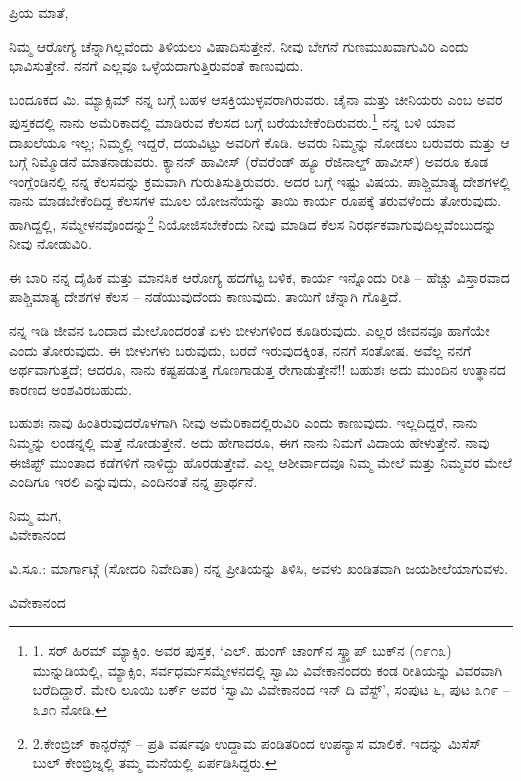 ಪ್ರಿಯ ಮಾತೆ,

ನಿಮ್ಮ ಆರೋಗ್ಯ ಚೆನ್ನಾಗಿಲ್ಲವೆಂದು ತಿಳಿಯಲು ವಿಷಾದಿಸುತ್ತೇನೆ. ನೀವು ಬೇಗನೆ ಗುಣಮುಖವಾಗುವಿರಿ ಎಂದು ಭಾವಿಸುತ್ತೇನೆ. ನನಗೆ ಎಲ್ಲವೂ ಒಳ್ಳೆಯದಾಗುತ್ತಿರುವಂತೆ ಕಾಣುವುದು.

ಬಂದೂಕದ ಮಿ. ಮ್ಯಾಕ್ಸಿಮ್​ ನನ್ನ ಬಗ್ಗೆ ಬಹಳ ಆಸಕ್ತಿಯುಳ್ಳವರಾಗಿರುವರು. ಚೈನಾ ಮತ್ತು ಚೀನಿಯರು ಎಂಬ ಅವರ ಪುಸ್ತಕದಲ್ಲಿ ನಾನು ಅಮೆರಿಕಾದಲ್ಲಿ ಮಾಡಿರುವ ಕೆಲಸದ ಬಗ್ಗೆ ಬರೆಯಬೇಕೆಂದಿರುವರು.\footnote{1. ಸರ್ ಹಿರಮ್​ ಮ್ಯಾಕ್ಸಿಂ. ಅವರ ಪುಸ್ತಕ, ‘ಎಲ್. ಹುಂಗ್ ಚಾಂಗ್​ನ ಸ್ಕ್ರ್ಯಾಪ್ ಬುಕ್​ನ (೧೯೧೩) ಮುನ್ನುಡಿಯಲ್ಲಿ, ಮ್ಯಾಕ್ಸಿಂ, ಸರ್ವಧರ್ಮಸಮ್ಮೇಳನದಲ್ಲಿ ಸ್ವಾಮಿ ವಿವೇಕಾನಂದರು ಕಂಡ ರೀತಿಯನ್ನು ವಿವರವಾಗಿ ಬರೆದಿದ್ದಾರೆ. ಮೇರಿ ಲೂಯಿ ಬರ್ಕ್ ಅವರ ‘ಸ್ವಾಮಿ ವಿವೇಕಾನಂದ ಇನ್ ದಿ ವೆಸ್ಟ್’, ಸಂಪುಟ ೬, ಪುಟ ೩೧೯ – ೩೨೧ ನೋಡಿ.} ನನ್ನ ಬಳಿ ಯಾವ ದಾಖಲೆಯೂ ಇಲ್ಲ; ನಿಮ್ಮಲ್ಲಿ ಇದ್ದರೆ, ದಯವಿಟ್ಟು ಅವರಿಗೆ ಕೊಡಿ. ಅವರು ನಿಮ್ಮನ್ನು ನೋಡಲು ಬರುವರು ಮತ್ತು ಆ ಬಗ್ಗೆ ನಿಮ್ಮೊಡನೆ ಮಾತನಾಡುವರು. ಕ್ಯಾನನ್ ಹಾವೀಸ್ (ರೆವರೆಂಡ್ ಹ್ಯೂ ರೆಜಿನಾಲ್ಡ್ ಹಾವೀಸ್) ಅವರೂ ಕೂಡ ಇಂಗ್ಲೆಂಡಿನಲ್ಲಿ ನನ್ನ ಕೆಲಸವನ್ನು ಕ್ರಮವಾಗಿ ಗುರುತಿಸುತ್ತಿರುವರು. ಅದರ ಬಗ್ಗೆ ಇಷ್ಟು ವಿಷಯ. ಪಾಶ್ಚಿಮಾತ್ಯ ದೇಶಗಳಲ್ಲಿ ನಾನು ಮಾಡಬೇಕೆಂದಿದ್ದ ಕೆಲಸಗಳ ಮೂಲ ಯೋಜನೆಯನ್ನು ತಾಯಿ ಕಾರ್ಯ ರೂಪಕ್ಕೆ ತರುವಳೆಂದು ತೋರುವುದು. ಹಾಗಿದ್ದಲ್ಲಿ, ಸಮ್ಮೇಳನವೊಂದನ್ನು\footnote{2.ಕೇಂಬ್ರಿಜ್ ಕಾನ್ಫರೆನ್ಸ್ – ಪ್ರತಿ ವರ್ಷವೂ ಉದ್ದಾಮ ಪಂಡಿತರಿಂದ ಉಪನ್ಯಾಸ ಮಾಲಿಕೆ. ಇದನ್ನು ಮಿಸೆಸ್ ಬುಲ್ ಕೇಂಬ್ರಿಜ್ನಲ್ಲಿ ತಮ್ಮ ಮನೆಯಲ್ಲಿ ಏರ್ಪಡಿಸಿದ್ದರು.} ನಿಯೋಜಿಸಬೇಕೆಂದು ನೀವು ಮಾಡಿದ ಕೆಲಸ ನಿರರ್ಥಕವಾಗುವುದಿಲ್ಲವೆಂಬುದನ್ನು ನೀವು ನೋಡುವಿರಿ.

ಈ ಬಾರಿ ನನ್ನ ದೈಹಿಕ ಮತ್ತು ಮಾನಸಿಕ ಆರೋಗ್ಯ ಹದಗೆಟ್ಟ ಬಳಿಕ, ಕಾರ್ಯ ಇನ್ನೊಂದು ರೀತಿ – ಹೆಚ್ಚು ವಿಸ್ತಾರವಾದ ಪಾಶ್ಚಿಮಾತ್ಯ ದೇಶಗಳ ಕೆಲಸ – ನಡೆಯುವುದೆಂದು ಕಾಣುವುದು. ತಾಯಿಗೆ ಚೆನ್ನಾಗಿ ಗೊತ್ತಿದೆ.

ನನ್ನ ಇಡಿ ಜೀವನ ಒಂದಾದ ಮೇಲೊಂದರಂತೆ ಏಳು ಬೀಳುಗಳಿಂದ ಕೂಡಿರುವುದು. ಎಲ್ಲರ ಜೀವನವೂ ಹಾಗೆಯೇ ಎಂದು ತೋರುವುದು. ಈ ಬೀಳುಗಳು ಬರುವುದು, ಬರದೆ ಇರುವುದಕ್ಕಿಂತ, ನನಗೆ ಸಂತೋಷ. ಅವೆಲ್ಲ ನನಗೆ ಅರ್ಥವಾಗುತ್ತದೆ; ಆದರೂ, ನಾನು ಕಷ್ಟಪಡುತ್ತ ಗೊಣಗಾಡುತ್ತ ರೇಗಾಡುತ್ತೇನೆ!! ಬಹುಶಃ ಅದು ಮುಂದಿನ ಉತ್ಥಾನದ ಕಾರಣದ ಅಂಶವಿರಬಹುದು.

ಬಹುಶಃ ನಾವು ಹಿಂತಿರುವುದರೊಳಗಾಗಿ ನೀವು ಅಮೆರಿಕಾದಲ್ಲಿರುವಿರಿ ಎಂದು ಕಾಣುವುದು. ಇಲ್ಲದಿದ್ದರೆ, ನಾನು ನಿಮ್ಮನ್ನು ಲಂಡನ್ನಲ್ಲಿ ಮತ್ತೆ ನೋಡುತ್ತೇನೆ. ಅದು ಹೇಗಾದರೂ, ಈಗ ನಾನು ನಿಮಗೆ ವಿದಾಯ ಹೇಳುತ್ತೇನೆ. ನಾವು ಈಜಿಪ್ಟ್ ಮುಂತಾದ ಕಡೆಗಳಿಗೆ ನಾಳಿದ್ದು ಹೊರಡುತ್ತೇವೆ. ಎಲ್ಲ ಆಶೀರ್ವಾದವೂ ನಿಮ್ಮ ಮೇಲೆ ಮತ್ತು ನಿಮ್ಮವರ ಮೇಲೆ ಎಂದಿಗೂ ಇರಲಿ ಎನ್ನುವುದು, ಎಂದಿನಂತೆ ನನ್ನ ಪ್ರಾರ್ಥನೆ.

\begin{flushright}
ನಿಮ್ಮ ಮಗ,\\ವಿವೇಕಾನಂದ
\end{flushright}

ವಿ.ಸೂ.: ಮಾರ್ಗಾಟ್ಗೆ (ಸೋದರಿ ನಿವೇದಿತಾ) ನನ್ನ ಪ್ರೀತಿಯನ್ನು ತಿಳಿಸಿ, ಅವಳು ಖಂಡಿತವಾಗಿ ಜಯಶೀಲೆಯಾಗುವಳು.

\begin{flushright}
ವಿವೇಕಾನಂದ
\end{flushright}

